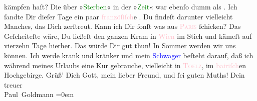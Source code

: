                kämpfen haſt? Die \label{K_L02728-5v}\label{K_L02728-5h} über »\textcolor{green}{Sterben}{}\ledrightnote{\textcolor{green}{Sterben. Novelle}}« in der »\textcolor{green}{Zeit}{}\ledrightnote{\textcolor{green}{Die Zeit. Wiener Wochenschrift}}« war ebenſo dumm als \label{K_L02728-2v}\label{K_L02728-2h}.\pend
           \pstart
           Ich ſandte Dir dieſer Tage ein paar \textcolor{pink}{franzöſiſch}{}e \label{K_L02728-4v}\label{K_L02728-4h}. Du findeſt darunter vielleicht Manches, das Dich zerſtreut.
               Kann ich Dir ſonſt was aus \textsc{\textcolor{pink}{Paris}{}\ledrightnote{\textcolor{pink}{Paris}}} ſchicken? Das Geſcheiteſte wäre, Du ließeſt den ganzen Kram in \textcolor{pink}{Wien}{}\ledrightnote{\textcolor{pink}{Wien}} im Stich und kämeſt auf vierzehn Tage hierher. Das würde
               Dir gut thun!\pend
           \pstart
           {\pb}In Sommer werden wir uns \label{K_L02728-3v}\label{K_L02728-3h} können. Ich werde krank und
               kränker und mein \textcolor{blue}{Schwager}{}
               beſteht darauf, daß ich während meines Urlaubs eine Kur gebrauche, vielleicht in \textsc{\textcolor{pink}{Toelz}{}\ledrightnote{\textcolor{pink}{Bad Tölz}}}, im \textcolor{pink}{bairiſch}{}en
               Hochgebirge.\pend
           \pstart
           Grüß’ Dich Gott, mein lieber Freund, und ſei guten Muths!\pend
           \pstart
           Dein {\\[\baselineskip]}treuer {\\[\baselineskip]}\spacefill\mbox{Paul Goldmann}\pend
           \leftskip=0em{}\endnumbering{}\begin{anhang}\end{anhang}
      